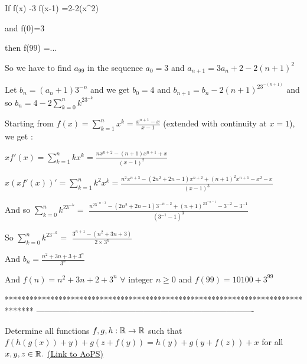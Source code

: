 \begin{solution}
	\begin{tcolorbox}If       f(x) -3 f(x-1) =2-2(x^2)

and f(0)=3

then f(99) =...\end{tcolorbox}
So we have to find $a_{99}$ in the sequence $a_0=3$ and $a_{n+1}=3a_n+2-2(n+1)^2$

Let $b_n=(a_n+1)3^{-n}$ and we get $b_0=4$ and $b_{n+1}=b_n-2(n+1)^23^{-(n+1)}$ and so $b_n=4-2\sum_{k=0}^nk^23^{-k}$

Starting from $f(x)=\sum_{k=1}^nx^k=\frac{x^{n+1}-x}{x-1}$ (extended with continuity at $x=1$), we get :

$xf'(x)=\sum_{k=1}^nkx^{k}=\frac{nx^{n+2}-(n+1)x^{n+1}+x}{(x-1)^2}$

$x(xf'(x))'=\sum_{k=1}^nk^2x^{k}=\frac{n^2x^{n+3}-(2n^2+2n-1)x^{n+2}+(n+1)^2x^{n+1}-x^2-x}{(x-1)^3}$

And so $\sum_{k=0}^nk^23^{-k}=$ $\frac{n^23^{-n-3}-(2n^2+2n-1)3^{-n-2}+(n+1)^23^{-n-1}-3^{-2}-3^{-1}}{(3^{-1}-1)^3}$

So $\sum_{k=0}^nk^23^{-k}=$ $\frac{3^{n+1}-(n^2+3n+3)}{2\times 3^n}$

And $b_n=\frac{n^2+3n+3+3^n}{3^n}$

And $\boxed{f(n)=n^2+3n+2+3^n}$ $\forall $ integer $n\ge 0$ and $f(99)=10100+3^{99}$
\end{solution}
*******************************************************************************
-------------------------------------------------------------------------------

\begin{problem}
	Determine all functions $f,g,h:\Bbb{R}\to\Bbb{R}$ such that $f(h(g(x)) + y) + g(z + f(y)) = h(y) + g(y + f(z)) + x$ for all $x,y,z\in \Bbb{R}.$
	\flushright \href{https://artofproblemsolving.com/community/c6h489518}{(Link to AoPS)}
\end{problem}



